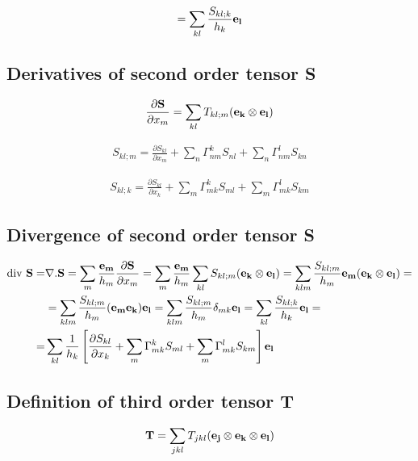\documentclass[11pt]{article}
\begin{document}
\begin{align}
= \sum_{kl} \frac{S_{kl;k}}{h_k}{\bf{e_l}}
\end{align}

\subsection{Derivatives of second order tensor S}

\begin{align}
\frac{\partial {\bf{S}}}{\partial x_m} = \sum_{kl} T_{kl;m} ({\bf{e_k}} \otimes {\bf{e_l}})
\end{align}

\begin{align}
S_{kl;m} = \frac{\partial S_{kl}}{\partial x_m} + \sum_n \Gamma_{nm}^k S_{nl} + \sum_n \Gamma_{nm}^l S_{kn}
\end{align}

\begin{align}
S_{kl;k} = \frac{\partial S_{kl}}{\partial x_k} + \sum_m \Gamma_{mk}^k S_{ml} + \sum_m \Gamma_{mk}^l S_{km}
\end{align}

\subsection{Divergence of second order tensor S}

\begin{align}
\mbox{div} \ {\bf{S}} = & \nabla . {\bf{S}} = \sum_m \frac{{\bf{e_m}}}{h_m} \frac{{\partial \bf{S}}}{\partial x_m} = \sum_m \frac{{\bf{e_m}}}{h_m} \sum_{kl} S_{kl;m} ({\bf{e_k}} \otimes {\bf{e_l}}) = \sum_{klm} \frac{S_{kl;m}}{h_m} {\bf{e_m}}({\bf{e_k}} \otimes {\bf{e_l}}) = \\
& = \sum_{klm} \frac{S_{kl;m}}{h_m} ({\bf{e_m}}{\bf{e_k}}) {\bf{e_l}} = \sum_{klm} \frac{S_{kl;m}}{h_m} \delta_{mk} {\bf{e_l}} =  \sum_{kl} \frac{S_{kl;k}}{h_k}{\bf{e_l}} = \\
= & \sum_{kl} \frac{1}{h_k} \left[ \frac{\partial S_{kl}}{\partial x_k} + \sum_m \Gamma_{mk}^k S_{ml} + \sum_m \Gamma_{mk}^l S_{km} \right] {\bf{e_l}}
\end{align}

\subsection{Definition of third order tensor T}

\begin{align}
{\bf{T}} = \sum_{jkl} T_{jkl} ({\bf{e_j}} \otimes {\bf{e_k}} \otimes {\bf{e_l}})
\end{align}
\end{document}
